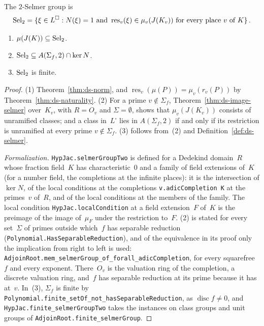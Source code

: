 \begin{definition}
\label{def:ds-sel2}
\leanok
{}
The $2$-Selmer group is
\[ \operatorname{Sel}_2 = \{\xi \in L^\square : N(\xi) = 1 \text{ and } \operatorname{res}_v(\xi) \in
   \mu_v(J(K_v)) \text{ for every place~$v$ of~$K$}\}\,. \]
\end{definition}

\begin{theorem}
\label{thm:ds-sel2}
\leanok
{}
\begin{enumerate}
  \item $\mu(J(K)) \subseteq \operatorname{Sel}_2$.
  \item $\operatorname{Sel}_2 \subseteq A(\Sigma_f, 2) \cap \ker N$.
  \item $\operatorname{Sel}_2$ is finite.
\end{enumerate}
\end{theorem}

\begin{proof}
\leanok
{}
(1) Theorem~\ref{thm:ds-norm}, and $\operatorname{res}_v(\mu(P)) = \mu_v(r_v(P))$ by
Theorem~\ref{thm:ds-naturality}. (2) For a prime $v \notin \Sigma_f$,
Theorem~\ref{thm:ds-image-selmer} over~$K_v$, with $R = O_v$ and $\Sigma = \emptyset$, shows
that $\mu_v(J(K_v))$ consists of unramified classes; and a class in~$L^\square$ lies in
$A(\Sigma_f, 2)$ if and only if its restriction is unramified at every prime $v \notin \Sigma_f$.
(3) follows from~(2) and Definition~\ref{def:ds-selmer}.

\emph{Formalization.} \texttt{HypJac.selmerGroupTwo} is defined for a Dedekind domain~$R$ whose
fraction field~$K$ has characteristic~$0$ and a family of field extensions of~$K$ (for a number
field, the completions at the infinite places): it is the intersection of $\ker N$, of the local
conditions at the completions \texttt{v.adicCompletion K} at the primes~$v$ of~$R$, and of the
local conditions at the members of the family. The local condition \texttt{HypJac.localCondition}
at a field extension~$F$ of~$K$ is the preimage of the image of~$\mu_F$ under the restriction
to~$F$. (2) is stated for every set~$\Sigma$ of primes outside which~$f$ has separable reduction
(\texttt{Polynomial.HasSeparableReduction}), and of the equivalence in its proof only the
implication from right to left is used:
\texttt{AdjoinRoot.mem\_selmerGroup\_of\_forall\_adicCompletion}, for every squarefree~$f$ and every
exponent. There~$O_v$ is the valuation ring of the completion, a discrete valuation ring, and~$f$
has separable reduction at its prime because it has at~$v$. In~(3), $\Sigma_f$ is finite by
\texttt{Polynomial.finite\_setOf\_not\_hasSeparableReduction}, as $\operatorname{disc} f \ne 0$, and
\texttt{HypJac.finite\_selmerGroupTwo} takes the instances on class groups and unit groups of
\texttt{AdjoinRoot.finite\_selmerGroup}.
\end{proof}

